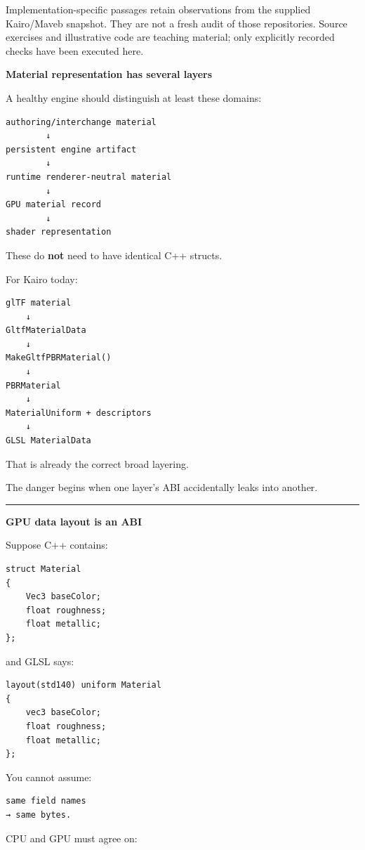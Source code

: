 Implementation-specific passages retain observations from the supplied Kairo/Maveb snapshot. They are not a fresh audit of those repositories. Source exercises and illustrative code are teaching material; only explicitly recorded checks have been executed here.

\textbf{Material representation has several layers}

A healthy engine should distinguish at least these domains:

\begin{verbatim}
authoring/interchange material
        ↓
persistent engine artifact
        ↓
runtime renderer-neutral material
        ↓
GPU material record
        ↓
shader representation
\end{verbatim}

These do \textbf{not} need to have identical C++ structs.

For Kairo today:

\begin{verbatim}
glTF material
    ↓
GltfMaterialData
    ↓
MakeGltfPBRMaterial()
    ↓
PBRMaterial
    ↓
MaterialUniform + descriptors
    ↓
GLSL MaterialData
\end{verbatim}

That is already the correct broad layering.

The danger begins when one layer's ABI accidentally leaks into another.

\begin{center}\rule{0.5\linewidth}{0.5pt}\end{center}

\textbf{GPU data layout is an ABI}

Suppose C++ contains:

\begin{verbatim}
struct Material
{
    Vec3 baseColor;
    float roughness;
    float metallic;
};
\end{verbatim}

and GLSL says:

\begin{verbatim}
layout(std140) uniform Material
{
    vec3 baseColor;
    float roughness;
    float metallic;
};
\end{verbatim}

You cannot assume:

\begin{verbatim}
same field names
→ same bytes.
\end{verbatim}

CPU and GPU must agree on:

